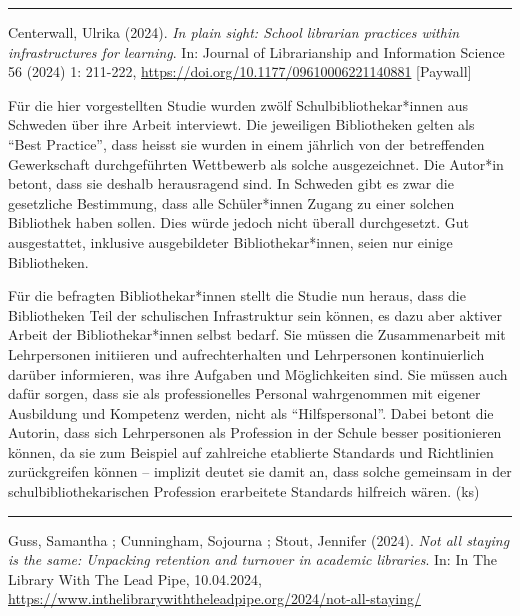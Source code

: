 \documentclass[a4paper,
fontsize=11pt,
oneside,
numbers=noperiodatend,
parskip=half-,
bibliography=totoc,
final
]{scrartcl}
\begin{document}
\begin{center}\rule{0.5\linewidth}{0.5pt}\end{center}

Centerwall, Ulrika (2024). \emph{In plain sight: School librarian
practices within infrastructures for learning}. In: Journal of
Librarianship and Information Science 56 (2024) 1: 211-222,
\url{https://doi.org/10.1177/09610006221140881} {[}Paywall{]}

Für die hier vorgestellten Studie wurden zwölf Schulbibliothekar*innen
aus Schweden über ihre Arbeit interviewt. Die jeweiligen Bibliotheken
gelten als \enquote{Best Practice}, dass heisst sie wurden in einem
jährlich von der betreffenden Gewerkschaft durchgeführten Wettbewerb als
solche ausgezeichnet. Die Autor*in betont, dass sie deshalb herausragend
sind. In Schweden gibt es zwar die gesetzliche Bestimmung, dass alle
Schüler*innen Zugang zu einer solchen Bibliothek haben sollen. Dies
würde jedoch nicht überall durchgesetzt. Gut ausgestattet, inklusive
ausgebildeter Bibliothekar*innen, seien nur einige Bibliotheken.

Für die befragten Bibliothekar*innen stellt die Studie nun heraus, dass
die Bibliotheken Teil der schulischen Infrastruktur sein können, es dazu
aber aktiver Arbeit der Bibliothekar*innen selbst bedarf. Sie müssen die
Zusammenarbeit mit Lehrpersonen initiieren und aufrechterhalten und
Lehrpersonen kontinuierlich darüber informieren, was ihre Aufgaben und
Möglichkeiten sind. Sie müssen auch dafür sorgen, dass sie als
professionelles Personal wahrgenommen mit eigener Ausbildung und
Kompetenz werden, nicht als \enquote{Hilfspersonal}. Dabei betont die
Autorin, dass sich Lehrpersonen als Profession in der Schule besser
positionieren können, da sie zum Beispiel auf zahlreiche etablierte
Standards und Richtlinien zurückgreifen können -- implizit deutet sie
damit an, dass solche gemeinsam in der schulbibliothekarischen
Profession erarbeitete Standards hilfreich wären. (ks)

\begin{center}\rule{0.5\linewidth}{0.5pt}\end{center}

Guss, Samantha ; Cunningham, Sojourna ; Stout, Jennifer (2024).
\emph{Not all staying is the same: Unpacking retention and turnover in
academic libraries}. In: In The Library With The Lead Pipe, 10.04.2024,
\url{https://www.inthelibrarywiththeleadpipe.org/2024/not-all-staying/}
\end{document}
